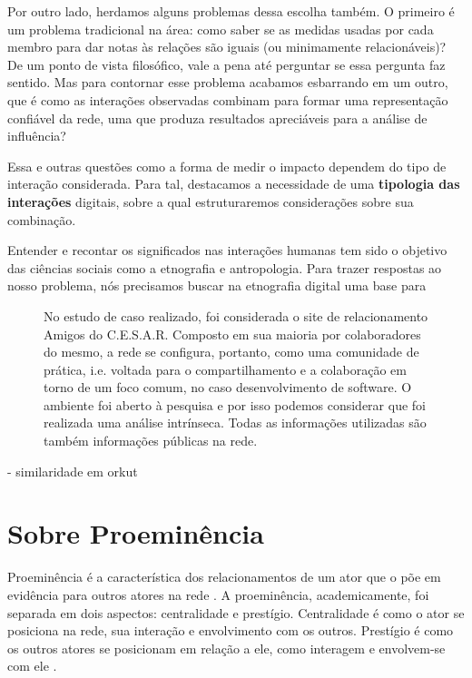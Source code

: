 \documentclass{article}
\begin{document}
Por outro lado, herdamos alguns problemas dessa escolha também. O primeiro é um
problema tradicional na área: como saber se as medidas usadas por cada
membro para dar notas às relações são iguais (ou minimamente relacionáveis)? De
um ponto de vista filosófico, vale a pena até perguntar se essa pergunta faz
sentido. Mas para contornar esse problema acabamos esbarrando em um outro, que é
como as interações observadas combinam para formar uma representação confiável
da rede, uma que produza resultados apreciáveis para a análise de influência? 

Essa e outras questões como a forma de medir o impacto dependem do tipo de
interação considerada.  Para tal, destacamos a necessidade de uma
\textbf{tipologia das interações} digitais, sobre a qual estruturaremos considerações sobre sua combinação.

Entender e recontar os significados nas interações humanas tem sido o objetivo
das ciências sociais como a etnografia e antropologia. Para trazer respostas ao
nosso problema, nós precisamos buscar na etnografia digital uma base para 

\begin{figure}
\begin{boxedminipage}{2in}
No estudo de caso realizado, foi considerada o site de relacionamento Amigos do
C.E.S.A.R. Composto em sua maioria por colaboradores do mesmo, a rede se
configura, portanto, como uma comunidade de prática, i.e. voltada para o
compartilhamento e a colaboração em torno de um foco comum, no caso
desenvolvimento de software. O ambiente foi aberto à pesquisa e por isso podemos
considerar que foi realizada uma análise intrínseca. Todas as informações
utilizadas são também informações públicas na rede.
\end{boxedminipage}
\end{figure}

\cite{Spertus2005} - similaridade em orkut

\section{Sobre Proeminência}

Proeminência é a característica dos relacionamentos de um ator que o põe em
evidência para outros atores na rede \cite{Wasserman}. A proeminência,
academicamente, foi separada em dois aspectos: centralidade e prestígio.
Centralidade é como o ator se posiciona na rede, sua interação e envolvimento com
os outros. Prestígio é como os outros atores se posicionam em relação a ele, como
interagem e envolvem-se com ele \cite{Knoke1983}.
\end{document}
